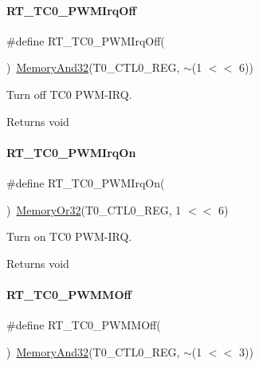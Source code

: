 \paragraph{\texorpdfstring{R\+T\+\_\+\+T\+C0\+\_\+\+P\+W\+M\+Irq\+Off}{RT\_TC0\_PWMIrqOff}}
{\footnotesize\ttfamily \#define R\+T\+\_\+\+T\+C0\+\_\+\+P\+W\+M\+Irq\+Off(\begin{DoxyParamCaption}{ }\end{DoxyParamCaption})~\mbox{\hyperlink{a00020_a5c1a2bd4c1bd4c2f429d8042a45327ff}{Memory\+And32}}(T0\+\_\+\+C\+T\+L0\+\_\+\+R\+EG, $\sim$(1 $<$$<$ 6))}



Turn off T\+C0 P\+W\+M-\/\+I\+RQ. 

\begin{DoxyReturn}{Returns}
void 
\end{DoxyReturn}
\mbox{\label{a00041_a76c2b1a397b2035b2f2f2e64940b790f}} 
\paragraph{\texorpdfstring{R\+T\+\_\+\+T\+C0\+\_\+\+P\+W\+M\+Irq\+On}{RT\_TC0\_PWMIrqOn}}
{\footnotesize\ttfamily \#define R\+T\+\_\+\+T\+C0\+\_\+\+P\+W\+M\+Irq\+On(\begin{DoxyParamCaption}{ }\end{DoxyParamCaption})~\mbox{\hyperlink{a00020_a9ea92ebccdef6bdaca4d00210cc7266d}{Memory\+Or32}}(T0\+\_\+\+C\+T\+L0\+\_\+\+R\+EG, 1 $<$$<$ 6)}



Turn on T\+C0 P\+W\+M-\/\+I\+RQ. 

\begin{DoxyReturn}{Returns}
void 
\end{DoxyReturn}
\mbox{\label{a00041_ab3d4fe7b156ef14b033ad020108fa386}} 
\paragraph{\texorpdfstring{R\+T\+\_\+\+T\+C0\+\_\+\+P\+W\+M\+M\+Off}{RT\_TC0\_PWMMOff}}
{\footnotesize\ttfamily \#define R\+T\+\_\+\+T\+C0\+\_\+\+P\+W\+M\+M\+Off(\begin{DoxyParamCaption}{ }\end{DoxyParamCaption})~\mbox{\hyperlink{a00020_a5c1a2bd4c1bd4c2f429d8042a45327ff}{Memory\+And32}}(T0\+\_\+\+C\+T\+L0\+\_\+\+R\+EG, $\sim$(1 $<$$<$ 3))}



